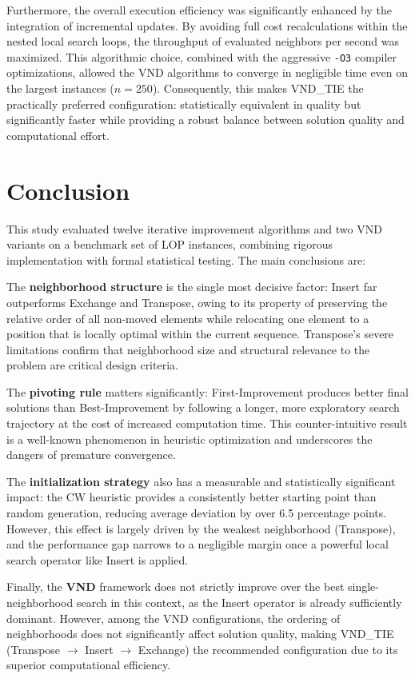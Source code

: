 \documentclass[11pt, a4paper]{article}
\begin{document}
Furthermore, the overall execution efficiency was significantly enhanced by the integration of incremental updates. By avoiding full cost recalculations within the nested local search loops, the throughput of evaluated neighbors per second was maximized. This algorithmic choice, combined with the aggressive \texttt{-O3} compiler optimizations, allowed the VND algorithms to converge in negligible time even on the largest instances ($n=250$). Consequently, this makes VND\_TIE the practically preferred configuration: statistically equivalent in quality but significantly faster while providing a robust balance between solution quality and computational effort.

\section{Conclusion}
\label{sec:conclusion}

This study evaluated twelve iterative improvement algorithms and two VND variants on a benchmark set of LOP instances, combining rigorous implementation with formal statistical testing. The main conclusions are:

The \textbf{neighborhood structure} is the single most decisive factor: Insert far outperforms Exchange and Transpose, owing to its property of preserving the relative order of all non-moved elements while relocating one element to a position that is locally optimal within the current sequence. Transpose's severe limitations confirm that neighborhood size and structural relevance to the problem are critical design criteria.

The \textbf{pivoting rule} matters significantly: First-Improvement produces better final solutions than Best-Improvement by following a longer, more exploratory search trajectory at the cost of increased computation time. This counter-intuitive result is a well-known phenomenon in heuristic optimization and underscores the dangers of premature convergence.

The \textbf{initialization strategy} also has a measurable and statistically significant impact: the CW heuristic provides a consistently better starting point than random generation, reducing average deviation by over 6.5 percentage points. However, this effect is largely driven by the weakest neighborhood (Transpose), and the performance gap narrows to a negligible margin once a powerful local search operator like Insert is applied.

Finally, the \textbf{VND} framework does not strictly improve over the best single-neighborhood search in this context, as the Insert operator is already sufficiently dominant. However, among the VND configurations, the ordering of neighborhoods does not significantly affect solution quality, making VND\_TIE (Transpose $\to$ Insert $\to$ Exchange) the recommended configuration due to its superior computational efficiency.
\end{document}
